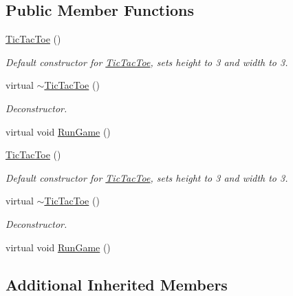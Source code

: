 \subsection*{Public Member Functions}
\begin{DoxyCompactItemize}
\item 
\hyperlink{classTicTacToe_a103fe9a5ae41b5ef756e20594a70cb7a}{Tic\-Tac\-Toe} ()
\begin{DoxyCompactList}\small\item\em Default constructor for \hyperlink{classTicTacToe}{Tic\-Tac\-Toe}, sets height to 3 and width to 3. \end{DoxyCompactList}\item 
\hypertarget{classTicTacToe_a5e9c4ed3279034d5530cc7b94a3e10e5}{virtual \hyperlink{classTicTacToe_a5e9c4ed3279034d5530cc7b94a3e10e5}{$\sim$\-Tic\-Tac\-Toe} ()}\label{classTicTacToe_a5e9c4ed3279034d5530cc7b94a3e10e5}

\begin{DoxyCompactList}\small\item\em Deconstructor. \end{DoxyCompactList}\item 
virtual void \hyperlink{classTicTacToe_a811356ea0290bf50ca522c79bead1e05}{Run\-Game} ()
\item 
\hypertarget{classTicTacToe_a103fe9a5ae41b5ef756e20594a70cb7a}{\hyperlink{classTicTacToe_a103fe9a5ae41b5ef756e20594a70cb7a}{Tic\-Tac\-Toe} ()}\label{classTicTacToe_a103fe9a5ae41b5ef756e20594a70cb7a}

\begin{DoxyCompactList}\small\item\em Default constructor for \hyperlink{classTicTacToe}{Tic\-Tac\-Toe}, sets height to 3 and width to 3. \end{DoxyCompactList}\item 
\hypertarget{classTicTacToe_a1094c0058c18aac2751c89f8bd1ea8ff}{virtual \hyperlink{classTicTacToe_a1094c0058c18aac2751c89f8bd1ea8ff}{$\sim$\-Tic\-Tac\-Toe} ()}\label{classTicTacToe_a1094c0058c18aac2751c89f8bd1ea8ff}

\begin{DoxyCompactList}\small\item\em Deconstructor. \end{DoxyCompactList}\item 
virtual void \hyperlink{classTicTacToe_a233703b78605561c39e680609a7a46e7}{Run\-Game} ()
\end{DoxyCompactItemize}
\subsection*{Additional Inherited Members}


